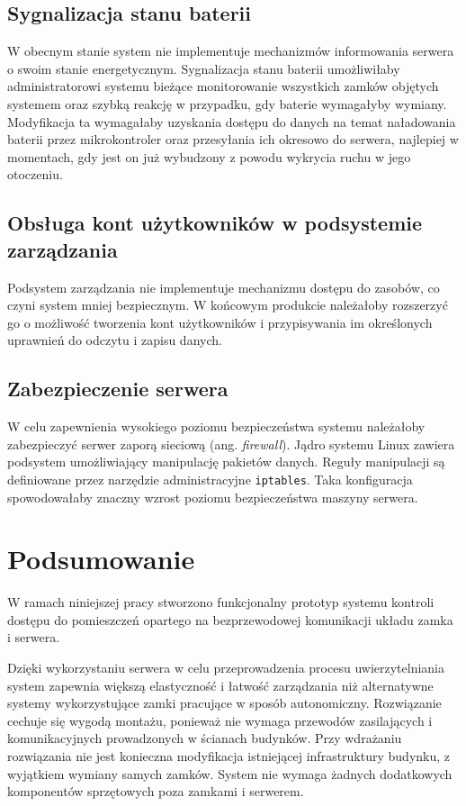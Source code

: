         \subsection{Sygnalizacja stanu baterii}

            W obecnym stanie system nie implementuje mechanizmów informowania serwera o swoim stanie energetycznym.
            Sygnalizacja stanu baterii umożliwiłaby administratorowi systemu bieżące monitorowanie wszystkich zamków objętych systemem oraz szybką reakcję w przypadku, gdy baterie wymagałyby wymiany. Modyfikacja ta wymagałaby uzyskania dostępu do danych na temat naładowania baterii przez mikrokontroler oraz przesyłania ich okresowo do serwera, najlepiej w momentach, gdy jest on już wybudzony z powodu wykrycia ruchu w jego otoczeniu.

        \subsection{Obsługa kont użytkowników w podsystemie zarządzania}

            Podsystem zarządzania nie implementuje mechanizmu dostępu do zasobów, co czyni system mniej bezpiecznym. W końcowym produkcie należałoby rozszerzyć go o możliwość tworzenia kont użytkowników i przypisywania im określonych uprawnień do odczytu i zapisu danych.

        \subsection{Zabezpieczenie serwera}

            W celu zapewnienia wysokiego poziomu bezpieczeństwa systemu należałoby zabezpieczyć serwer zaporą sieciową (ang. \textit{firewall}). Jądro systemu Linux zawiera podsystem umożliwiający manipulację pakietów danych. Reguły manipulacji są definiowane przez narzędzie administracyjne \texttt{iptables}. Taka konfiguracja spowodowałaby znaczny wzrost poziomu bezpieczeństwa maszyny serwera.


    \section{Podsumowanie}

        W ramach niniejszej pracy stworzono funkcjonalny prototyp systemu kontroli dostępu do pomieszczeń opartego na bezprzewodowej komunikacji układu zamka i serwera.

        Dzięki wykorzystaniu serwera w celu przeprowadzenia procesu uwierzytelniania system zapewnia większą elastyczność i łatwość zarządzania niż alternatywne systemy wykorzystujące zamki pracujące w sposób autonomiczny. Rozwiązanie cechuje się wygodą montażu, ponieważ nie wymaga przewodów zasilających i komunikacyjnych prowadzonych w ścianach budynków. Przy wdrażaniu rozwiązania nie jest konieczna modyfikacja istniejącej infrastruktury budynku, z wyjątkiem wymiany samych zamków. System nie wymaga żadnych dodatkowych komponentów sprzętowych poza zamkami i serwerem.

